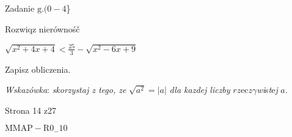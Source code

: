 \documentclass[a4paper,12pt]{article}
\begin{document}
Zadanie $\mathrm{g}. (0-4$\}

Rozwiqz nierównośč

$\displaystyle \sqrt{x^{2}+4x+4}<\frac{25}{3}-\sqrt{x^{2}-6x+9}$

Zapisz obliczenia.

{\it Wskazówka}: {\it skorzystaj z tego, ze} $\sqrt{a^{2}}=|a|$ {\it dla kazdej liczby} $ rz\mathrm{e}\mathrm{c}z\gamma${\it wi}s{\it t}e{\it j} $a.$

Strona 14 z27

$\mathrm{M}\mathrm{M}\mathrm{A}\mathrm{P}-\mathrm{R}0_{-}10$
\end{document}
